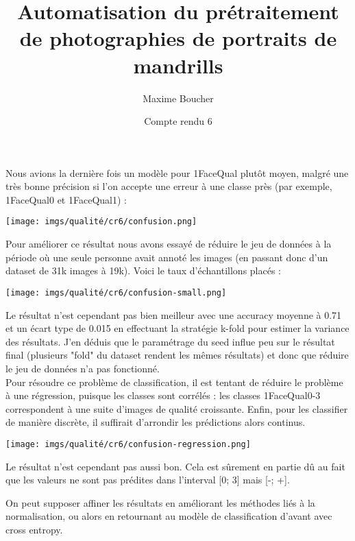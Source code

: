 \documentclass{article}
\title{Automatisation du prétraitement de photographies de portraits de mandrills}
\author{Maxime Boucher}
\date{Compte rendu 6}
\begin{document}
\maketitle

Nous avions la dernière fois un modèle pour 1FaceQual plutôt moyen, malgré une très bonne précision si l'on accepte une erreur à une classe près (par exemple,
1FaceQual0 et 1FaceQual1) :
\begin{center}
    \texttt{[image: imgs/qualité/cr6/confusion.png]}
\end{center}

Pour améliorer ce résultat nous avons essayé de réduire le jeu de données à la période où une seule personne avait annoté les images (en passant donc d'un dataset de 31k images à 19k).
Voici le taux d'échantillons placés : 
\begin{center}
    \texttt{[image: imgs/qualité/cr6/confusion-small.png]}
\end{center}

Le résultat n'est cependant pas bien meilleur avec une accuracy moyenne à 0.71 et un écart type de 0.015 en effectuant la stratégie k-fold pour estimer la variance des résultats. J'en déduis que le paramétrage du seed influe peu sur le résultat final (plusieurs "fold" du dataset rendent les mêmes résultats) et donc que réduire le jeu de données n'a pas fonctionné.\\


Pour résoudre ce problème de classification, il est tentant de réduire le problème à une régression, puisque les classes sont corrélés : les classes 1FaceQual0-3 correspondent à une suite d'images de qualité croissante.
Enfin, pour les classifier de manière discrète, il suffirait d'arrondir les prédictions alors continus.
\begin{center}
    \texttt{[image: imgs/qualité/cr6/confusion-regression.png]}
\end{center}

Le résultat n'est cependant pas aussi bon. Cela est sûrement en partie dû au fait que les valeurs ne sont pas prédites dans l'interval [0; 3] mais [-\infty; +\infty].

On peut supposer affiner les résultats en améliorant les méthodes liés à la normalisation, ou alors en retournant au modèle de classification d'avant avec cross entropy.
\end{document}
